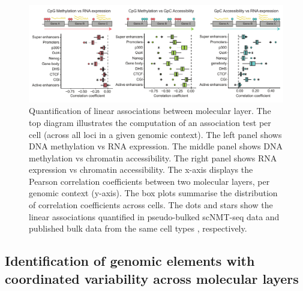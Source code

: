 \begin{figure}[H]
	\centering
	\includegraphics[width=1.0\linewidth]{scNMT_correlations_acrossgenes}
	\caption[]{Quantification of linear associations between molecular layer. The top diagram illustrates the computation of an association test per cell (across all loci in a given genomic context). The left panel shows DNA methylation vs RNA expression. The middle panel shows DNA methylation vs chromatin accessibility. The right panel shows RNA expression vs chromatin accessibility. The x-axis displays the Pearson correlation coefficients between two molecular layers, per genomic context (y-axis). The box plots summarise the distribution of correlation coefficients across cells. The dots and stars show the linear associations quantified in pseudo-bulked scNMT-seq data and published bulk data from the same cell types \cite{Ficz2013,ENCODE2012}, respectively. }
	\label{fig:scNMT_correlations_acrossgenes}
\end{figure}




\subsection{Identification of genomic elements with coordinated variability across molecular layers}

